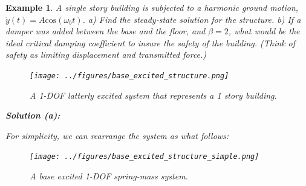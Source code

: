 \documentclass[12pt,letter]{article}
\newtheorem{ex}{Example}
\numberwithin{ex}{section} %
\newenvironment{example}{\begin{mdframed}[middlelinewidth=0.5mm]\begin{ex}\normalfont}{\end{ex}\end{mdframed}}
\numberwithin{re}{section} %
\numberwithin{pr}{section} %
\begin{document}
				\begin{example}
		
					A single story building is subjected to a harmonic ground motion, $\ddot{y}(t) = A \text{cos}(\omega_b t)$. a) Find the steady-state solution for the structure.  b) If a damper was added between the base and the floor, and $\beta=2$, what would be the ideal critical damping coefficient to insure the safety of the building. (Think of safety as limiting displacement and transmitted force.) 
					\begin{figure}[H]
						\centering
						\texttt{[image: ../figures/base\_excited\_structure.png]}
						\caption{A 1-DOF latterly excited system that represents a 1 story building. }
					\end{figure}				
								
					\noindent\textbf{Solution (a):}
						
					For simplicity, we can rearrange the system as what follows:
					\begin{figure}[H]
						\centering
						\texttt{[image: ../figures/base\_excited\_structure\_simple.png]}
						\caption{A base excited 1-DOF spring-mass system.}
					\end{figure}			
		

\end{example}
\end{document}
